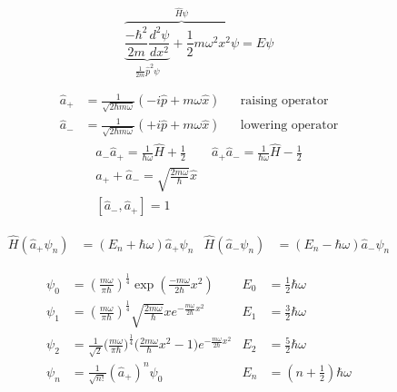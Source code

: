\noindent\begin{equation*}
    \overbrace{\underbrace{\frac{-\hbar^2}{2m}\frac{d^2\psi}{dx^2}}_{\frac{1}{2m}\hat{p}^2\psi} + \frac{1}{2}m \omega^2 x^2 \psi}^{\widehat{H}\psi}  = E\psi
\end{equation*}

\begin{align*}
    \widehat{a}_{+} & = \frac{1}{\sqrt{2\hbar m \omega}}\left(-i\widehat{p}+m\omega\widehat{x}\right) &  & \text{raising operator}  \\
    \widehat{a}_{-} & = \frac{1}{\sqrt{2\hbar m \omega}}\left(+i\widehat{p}+m\omega\widehat{x}\right) &  & \text{lowering operator}
\end{align*}
\noindent\begin{gather*}
    \widehat{a}_{-}\widehat{a}_{+}=\frac{1}{\hbar\omega}\widehat{H}+\frac{1}{2} \quad\quad \widehat{a}_{+}\widehat{a}_{-}=\frac{1}{\hbar\omega}\widehat{H}-\frac{1}{2} \\
    \widehat{a}_{+} + \widehat{a}_{-} = \sqrt{\frac{2m\omega}{\hbar}} \widehat{x} \\
    \left[\widehat{a}_{-},\widehat{a}_{+}\right] = 1
\end{gather*}

\begin{align*}
    \widehat{H}(\widehat{a}_{+}\psi_n) & = (E_n+\hbar\omega)\widehat{a}_{+}\psi_n &
    \widehat{H}(\widehat{a}_{-}\psi_n) & = (E_n-\hbar\omega)\widehat{a}_{-}\psi_n
\end{align*}

\noindent\begin{align*}
    \psi_0   & = {\left(\frac{m\omega}{\pi\hbar}\right)}^{\frac{1}{4}}\exp\left(\frac{-m\omega}{2\hbar}x^2\right)                                           & E_0 & = \frac{1}{2}\hbar\omega     \\
    \psi_{1} & ={\left(\frac{m\omega}{\pi\hbar}\right)}^{\frac{1}{4}}\sqrt{\frac{2m\omega}{\hbar}}xe^{-\frac{m\omega}{2\hbar}x^{2}}                         & E_1 & = \frac{3}{2}\hbar\omega     \\
    \psi_{2} & =\frac{1}{\sqrt{2}}{\Big(\frac{m\omega}{\pi\hbar}\Big)}^{\frac{1}{4}}\Big(\frac{2m\omega}{\hbar}x^{2}-1\Big)e^{-\frac{m\omega}{2\hbar}x^{2}} & E_2 & = \frac{5}{2}\hbar\omega     \\
    \psi_n   & = \frac{1}{\sqrt{n!}}{\left(\widehat{a}_{+}\right)}^n \psi_0                                                                                 & E_n & = (n+\frac{1}{2})\hbar\omega
\end{align*}

